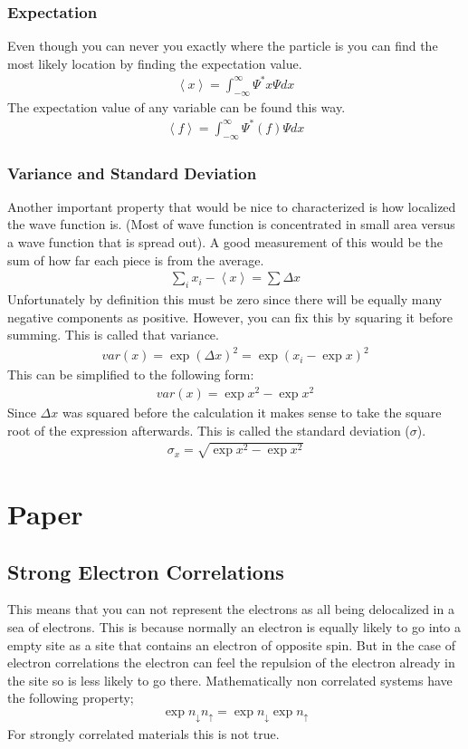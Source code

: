 \documentclass{article}
\begin{document}
\subsubsection{Expectation}
Even though you can never you exactly where the particle is you can find the most likely location by finding the expectation value.
\begin{align}
\left<x\right> = \int_{-\infty}^{\infty} \Psi^*x\Psi dx
\end{align}
The expectation value of any variable can be found this way. 
\begin{align}
\left<f\right> = \int_{-\infty}^{\infty} \Psi^*(f)\Psi dx
\end{align}
\subsubsection{Variance and Standard Deviation}
Another important property that would be nice to characterized is how localized the wave function is. (Most of wave function is concentrated in small area versus a wave function that is spread out). A good measurement of this would be the sum of how far each piece is from the average. 
\begin{align}
\sum_{i} x_i - \left< x\right> = \sum \Delta x
\end{align}
Unfortunately by definition this must be zero since there will be equally many negative components as positive. However, you can fix this by squaring it before summing. This is called that variance.
\begin{align}
var(x) = \exp{(\Delta x)^2} = \exp{(x_i - \exp{x})^2}
\end{align}
This can be simplified to the following form:
\begin{align}
var(x) = \exp{x^2} - \exp{x}^2
\end{align}
Since $\Delta x$ was squared before the calculation it makes sense to take the square root of the expression afterwards. This is called the standard deviation ($\sigma$).
\begin{align}
\sigma_x = \sqrt{\exp{x^2} - \exp{x}^2}
\end{align}
\section{Paper}
\subsection{Strong Electron Correlations}
This means that you can not represent the electrons as all being delocalized in a sea of electrons. This is because normally an electron is equally likely to go into a empty site as a site that contains an electron of opposite spin. But in the case of electron correlations the electron can feel the repulsion of the electron already in the site so is less likely to go there. Mathematically non correlated systems have the following property;
\begin{align}
 \exp{n_{\downarrow}n_{\uparrow}} = \exp{n_{\downarrow}} \exp{n_{\uparrow}}
\end{align}
For strongly correlated materials this is not true.
\end{document}
